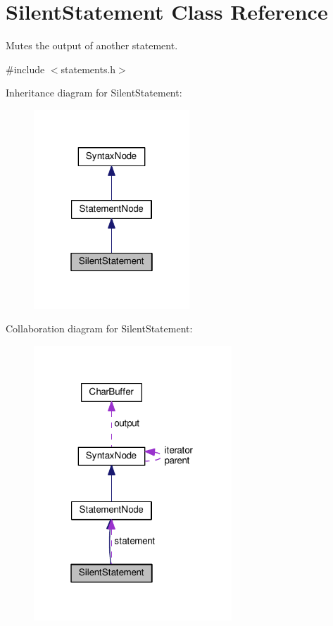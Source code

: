 \hypertarget{classSilentStatement}{}\section{Silent\+Statement Class Reference}
\label{classSilentStatement}


Mutes the output of another statement.  




{\ttfamily \#include $<$statements.\+h$>$}



Inheritance diagram for Silent\+Statement\+:
\nopagebreak
\begin{figure}[H]
\begin{center}
\leavevmode
\includegraphics[width=166pt]{d0/d36/classSilentStatement__inherit__graph}
\end{center}
\end{figure}


Collaboration diagram for Silent\+Statement\+:
\nopagebreak
\begin{figure}[H]
\begin{center}
\leavevmode
\includegraphics[width=211pt]{d3/de1/classSilentStatement__coll__graph}
\end{center}
\end{figure}
